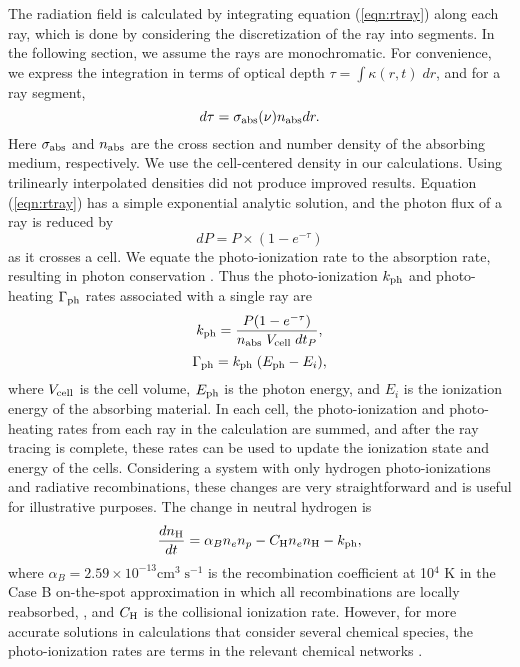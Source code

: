 \documentclass[useAMS,usenatbib]{mn2e}
\begin{document}
The radiation field is calculated by integrating equation
(\ref{eqn:rtray}) along each ray, which is done by considering the
discretization of the ray into segments.  In the following section, we
assume the rays are monochromatic.  For convenience, we express the
integration in terms of optical depth $\tau = \int \kappa(r,t) \; dr$,
and for a ray segment,
%
\begin{equation}
  \label{eqn:dtau}
  d\tau = \sigma_{\rm abs}(\nu) n_{\rm abs} dr.
\end{equation}
Here $\sigma_{\rm abs}$ and $n_{\rm abs}$ are the cross section and
number density of the absorbing medium, respectively.  We use the
cell-centered density in our calculations.  Using trilinearly
interpolated densities \citep[see][]{Mellema06} did not produce
improved results.  Equation (\ref{eqn:rtray}) has a simple exponential
analytic solution, and the photon flux of a ray is reduced by
%
\begin{equation}
  \label{eqn:flux}
  dP = P \times (1 - e^{-\tau})
\end{equation}
as it crosses a cell.  We equate the photo-ionization rate to the
absorption rate, resulting in photon conservation \citep{Abel99_RT,
  Mellema06}.  Thus the photo-ionization $k_{\rm ph}$ and
photo-heating $\Gamma_{\rm ph}$ rates associated with a single ray are
%
\begin{equation}
  \label{eqn:kph}
  k_{\rm ph} = \frac{P (1 - e^{-\tau})}{n_{\rm abs} \; V_{\rm cell} \; dt_P},
\end{equation}
\begin{equation}
  \label{eqn:gamma}
  \Gamma_{\rm ph} = k_{\rm ph} \; (E_{\rm ph} - E_i),
\end{equation}
where $V_{\rm cell}$ is the cell volume, $E_{\rm ph}$ is the photon
energy, and $E_i$ is the ionization energy of the absorbing material.
In each cell, the photo-ionization and photo-heating rates from each
ray in the calculation are summed, and after the ray tracing is
complete, these rates can be used to update the ionization state and
energy of the cells.  Considering a system with only hydrogen
photo-ionizations and radiative recombinations, these changes are very
straightforward and is useful for illustrative purposes.  The change
in neutral hydrogen is
%
\begin{equation}
\frac{dn_{\rm H}}{dt} = \alpha_B n_e n_p - C_{\rm H} n_e n_{\rm
  H} - k_{\rm ph},
\end{equation}
where $\alpha_B = 2.59 \times 10^{-13} \mathrm{cm}^3 \;
\mathrm{s}^{-1}$ is the recombination coefficient at 10$^4$ K in the
Case B on-the-spot approximation in which all recombinations are
locally reabsorbed, \citep{Spitzer78}, and $C_{\rm H}$ is the
collisional ionization rate.  However, for more accurate solutions in
calculations that consider several chemical species, the
photo-ionization rates are terms in the relevant chemical networks
\citep[e.g.][]{Abel97}.
\end{document}

